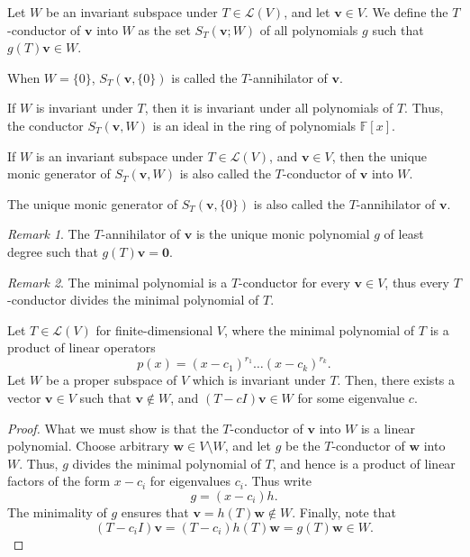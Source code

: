 \documentclass[11pt]{article}
\newcommand{\F}{\mathbb{F}}
\renewcommand{\vec}[1]{\boldsymbol{#1}}
\newcommand{\vv}{\vec{v}}
\newcommand{\vw}{\vec{w}}
\newcommand{\alg}[1]{\mathscr{#1}}
\newcommand{\algL}{\alg{L}}
\theoremstyle{definition}
\theoremstyle{remark}
\newtheorem*{remark}{Remark}
\numberwithin{equation}{section}
\begin{document}
    \begin{definition}
        Let $W$ be an invariant subspace under $T \in \algL(V)$, and let $\vv \in V$.
        We define the $T$-conductor of $\vv$ into $W$ as the set $S_T(\vv; W)$ of all
        polynomials $g$ such that $g(T)\vv \in W$.

        When $W = \{0\}$, $S_T(\vv, \{0\})$ is called the $T$-annihilator of
        $\vv$.
    \end{definition}

    \begin{lemma}
        If $W$ is invariant under $T$, then it is invariant under all polynomials of
        $T$. Thus, the conductor $S_T(\vv, W)$ is an ideal in the ring of polynomials
        $\F[x]$.
    \end{lemma}

    \begin{definition}
        If $W$ is an invariant subspace under $T \in \algL(V)$, and $\vv \in V$, then
        the unique monic generator of $S_T(\vv, W)$ is also called the $T$-conductor
        of $\vv$ into $W$.

        The unique monic generator of $S_T(\vv, \{0\})$ is also called the
        $T$-annihilator of $\vv$.
        \begin{remark}
            The $T$-annihilator of $\vv$ is the unique monic polynomial $g$ of least
            degree such that $g(T)\vv = \vec{0}$.
        \end{remark}
        \begin{remark}
            The minimal polynomial is a $T$-conductor for every $\vv \in V$, thus
            every $T$-conductor divides the minimal polynomial of $T$.
        \end{remark}
    \end{definition}

    \begin{lemma}
        Let $T \in \alg{L}(V)$ for finite-dimensional $V$, where the minimal
        polynomial of $T$ is a product of linear operators \[
            p(x) = (x - c_1)^{r_1} \dots (x - c_k)^{r_k}.
        \] Let $W$ be a proper subspace of $V$ which is invariant under $T$. Then,
        there exists a vector $\vv \in V$ such that $\vv \notin W$, and $(T - cI)\vv
        \in W$ for some eigenvalue $c$.
    \end{lemma}
    \begin{proof}
        What we must show is that the $T$-conductor of $\vv$ into $W$ is a linear
        polynomial. Choose arbitrary $\vw \in V\setminus W$, and let $g$ be the
        $T$-conductor of $\vw$ into $W$. Thus, $g$ divides the minimal polynomial of
        $T$, and hence is a product of linear factors of the form $x - c_i$ for
        eigenvalues $c_i$. Thus write \[
            g = (x - c_i)h.
        \] The minimality of $g$ ensures that $\vv = h(T)\vw \notin W$. Finally, note
        that \[
            (T - c_iI)\vv = (T - c_i)h(T)\vw = g(T)\vw \in W.
        \] 
    \end{proof}
\end{document}

